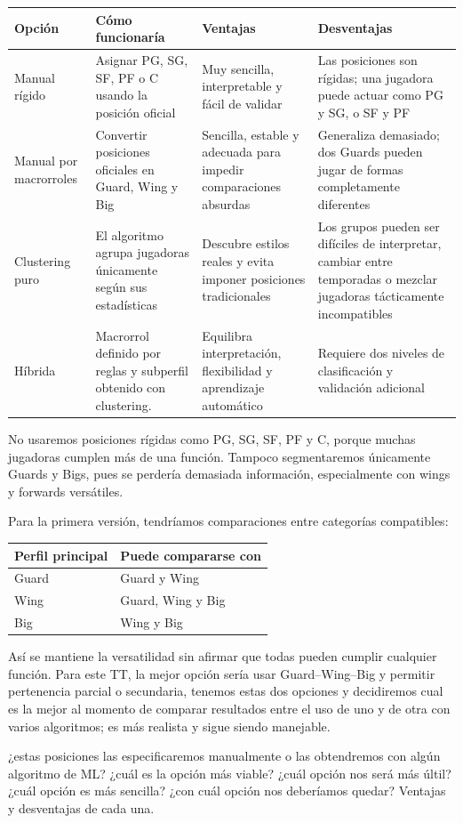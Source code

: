 \begin{longtable}{@{}p{2cm}p{3.4cm}p{3.6cm}p{3.6cm}@{}}
\toprule\textbf{Opción}&\textbf{Cómo funcionaría}&\textbf{Ventajas}&\textbf{Desventajas}\\\midrule\endhead
Manual rígido&Asignar PG, SG, SF, PF o C usando la posición oficial&Muy sencilla, interpretable y fácil de validar&Las posiciones son rígidas; una jugadora puede actuar como PG y SG, o SF y PF\\
Manual por macrorroles&Convertir posiciones oficiales en Guard, Wing y Big&Sencilla, estable y adecuada para impedir comparaciones absurdas&Generaliza demasiado; dos Guards pueden jugar de formas completamente diferentes\\
Clustering puro&El algoritmo agrupa jugadoras únicamente según sus estadísticas&Descubre estilos reales y evita imponer posiciones tradicionales&Los grupos pueden ser difíciles de interpretar, cambiar entre temporadas o mezclar jugadoras tácticamente incompatibles\\
Híbrida&Macrorrol definido por reglas y subperfil obtenido con clustering.&Equilibra interpretación, flexibilidad y aprendizaje automático&Requiere dos niveles de clasificación y validación adicional\\
\bottomrule
\end{longtable}

No usaremos posiciones rígidas como PG, SG, SF, PF y C, porque muchas jugadoras cumplen más de una función. Tampoco segmentaremos únicamente Guards y Bigs, pues se perdería demasiada información, especialmente con wings y forwards versátiles.

Para la primera versión, tendríamos comparaciones entre categorías compatibles:
\begin{longtable}{@{}p{4cm}p{7cm}@{}}
\toprule\textbf{Perfil principal}&\textbf{Puede compararse con}\\\midrule\endhead
Guard&Guard y Wing\\
Wing&Guard, Wing y Big\\
Big&Wing y Big\\
\bottomrule
\end{longtable}

Así se mantiene la versatilidad sin afirmar que todas pueden cumplir cualquier función. Para este TT, la mejor opción sería usar Guard–Wing–Big y permitir pertenencia parcial o secundaria, tenemos estas dos opciones y decidiremos cual es la mejor al momento de comparar resultados entre el uso de uno y de otra con varios algoritmos; es más realista y sigue siendo manejable.

¿estas posiciones las especificaremos manualmente o las obtendremos con algún algoritmo de ML? ¿cuál es la opción más viable? ¿cuál opción nos será más últil? ¿cuál opción es más sencilla? ¿con cuál opción nos deberíamos quedar? Ventajas y desventajas de cada una.
